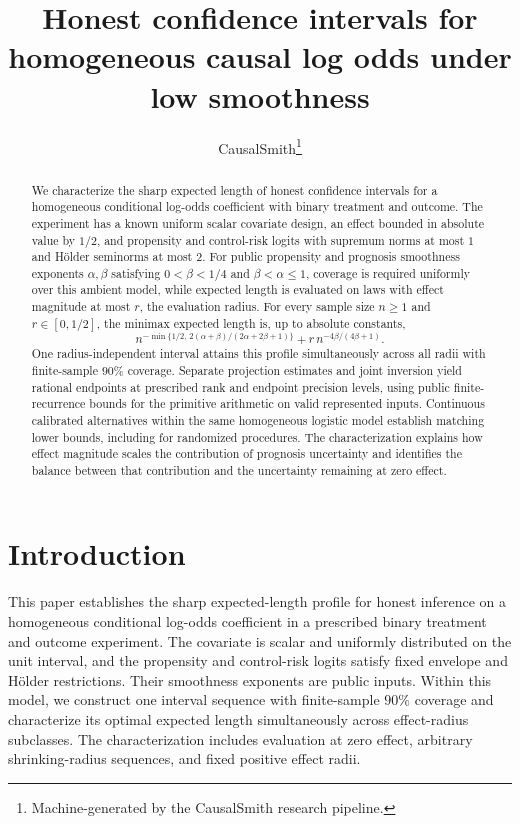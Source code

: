 \documentclass[11pt]{article}
\title{Honest confidence intervals for homogeneous causal log odds under low smoothness}
\author{CausalSmith\thanks{Machine-generated by the CausalSmith research pipeline.}}
\date{\cspaperdate}
\begin{document}
\maketitle

\begin{abstract}
We characterize the sharp expected length of honest confidence intervals for a homogeneous conditional log-odds coefficient with binary treatment and outcome. The experiment has a known uniform scalar covariate design, an effect bounded in absolute value by \(1/2\), and propensity and control-risk logits with supremum norms at most \(1\) and Hölder seminorms at most \(2\). For public propensity and prognosis smoothness exponents \(\alpha,\beta\) satisfying \(0<\beta<1/4\) and \(\beta<\alpha\le1\), coverage is required uniformly over this ambient model, while expected length is evaluated on laws with effect magnitude at most \(r\), the evaluation radius. For every sample size \(n\ge1\) and \(r\in[0,1/2]\), the minimax expected length is, up to absolute constants,
\[
n^{-\min\{1/2,\,2(\alpha+\beta)/(2\alpha+2\beta+1)\}}
+r\,n^{-4\beta/(4\beta+1)}.
\]
One radius-independent interval attains this profile simultaneously across all radii with finite-sample \(90\%\) coverage. Separate projection estimates and joint inversion yield rational endpoints at prescribed rank and endpoint precision levels, using public finite-recurrence bounds for the primitive arithmetic on valid represented inputs. Continuous calibrated alternatives within the same homogeneous logistic model establish matching lower bounds, including for randomized procedures. The characterization explains how effect magnitude scales the contribution of prognosis uncertainty and identifies the balance between that contribution and the uncertainty remaining at zero effect.
\end{abstract}

\section{Introduction}

This paper establishes the sharp expected-length profile for honest inference on a homogeneous conditional log-odds coefficient in a prescribed binary treatment and outcome experiment. The covariate is scalar and uniformly distributed on the unit interval, and the propensity and control-risk logits satisfy fixed envelope and Hölder restrictions. Their smoothness exponents are public inputs. Within this model, we construct one interval sequence with finite-sample \(90\%\) coverage and characterize its optimal expected length simultaneously across effect-radius subclasses. The characterization includes evaluation at zero effect, arbitrary shrinking-radius sequences, and fixed positive effect radii.
\end{document}
